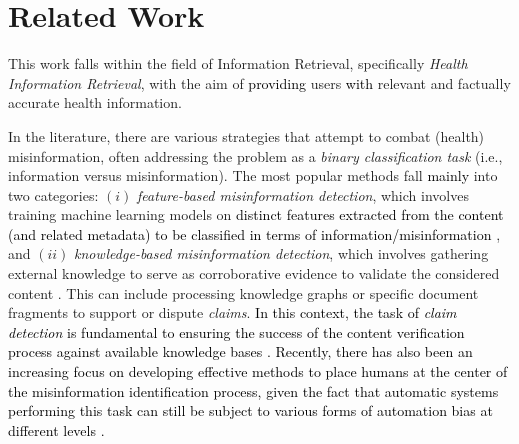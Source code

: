 \section{Related Work}
\label{sec:relatedwork}

This work falls within the field of Information Retrieval, specifically \textit{Health Information Retrieval}, with the aim of \textcolor{black}{providing} users \textcolor{black}{with} relevant and factually accurate health information. 

In the literature, there are various strategies that attempt to combat (health) misinformation, often addressing the problem as a \textit{binary classification task} (i.e., information versus misinformation).
The most popular methods %
fall \textcolor{black}{mainly} into two categories: $(i)$ \textit{feature-based misinformation detection}, which involves training machine learning models on \textcolor{black}{distinct features extracted from the content (and related metadata) to be classified in terms of information/misinformation} \citep{zhao2023panacea, mendes2022human, yue2022contrastive, jiang2022fake, chen2023can, upadhyay2023vec4cred, 10.1145/3462203.3475898, 10.1145/3599696.3612902}, and $(ii)$ \textit{knowledge-based misinformation detection}, which involves gathering external knowledge to serve as corroborative evidence to validate the considered content \citep{brand2021bart, kou2022hc, wu2022bias, upadhyay2023explainable, shang2022knowledge}. This can include processing knowledge graphs or specific document fragments to support or dispute \textit{claims}. \textcolor{black}{In this context, the task of \textit{claim detection} is fundamental to ensuring the success of the content verification process against available knowledge bases \cite{hassan2017toward,guo2022survey}. Recently, there has also been an increasing focus on developing effective methods to place humans at the center of the misinformation identification process, \textcolor{black}{given the fact that automatic systems performing this task can still be subject to various forms of automation bias at different levels \cite{zeng2024combining}.}}


